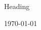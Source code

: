 \documentclass[paper=a4, fontsize=11pt]{scrartcl}
\theoremstyle{definition}
\begin{document}
\begin{center}
	{\LARGE Heading \par}
	\vspace*{0.5em}
	{\large \today \par}

\end{center}
\end{document}

